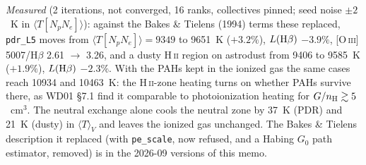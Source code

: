 \documentclass[english,a4paper]{my_memo}
\newcommand{\code}[1]{\texttt{#1}}
\begin{document}
\emph{Measured} (2 iterations, not converged, 16 ranks, collectives
pinned; seed noise $\pm2$~K in $\langle T[N_pN_e]\rangle$): against the
Bakes \& Tielens (1994) terms these replaced, \code{pdr\_L5} moves from
$\langle T[N_pN_e]\rangle = 9349$ to 9651~K ($+3.2\%$), $L({\rm H}\beta)$
$-3.9\%$, [O\,\textsc{iii}] 5007/H$\beta$ 2.61 $\to$ 3.26, and a dusty
H\,\textsc{ii} region on astrodust from 9406 to 9585~K ($+1.9\%$),
$L({\rm H}\beta)$ $-2.3\%$.  With the PAHs kept in the ionized gas the same
cases reach 10934 and 10463~K: the H\,\textsc{ii}-zone heating turns on
whether PAHs survive there, as WD01 \S7.1 find it comparable to
photoionization heating for $G/n_{\rm H} \gtrsim 5$~cm$^3$.  The neutral
exchange alone cools the neutral zone by 37~K (PDR) and 21~K (dusty) in
$\langle T\rangle_V$ and leaves the ionized gas unchanged.  The
Bakes \& Tielens description it replaced (with \code{pe\_scale}, now
refused, and a Habing $G_0$ path estimator, removed) is in the
2026-09 versions of this memo.
\end{document}
